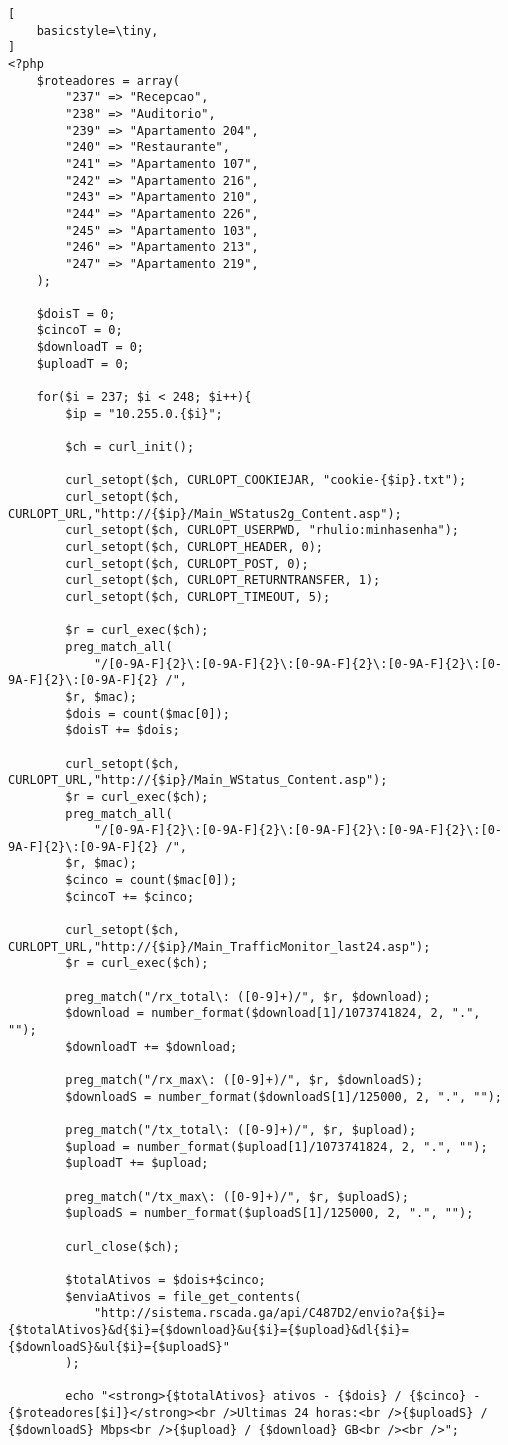 \label{an:anexo-roteadores}

\begin{lstlisting}[
    basicstyle=\tiny,
]
<?php
    $roteadores = array(
		"237" => "Recepcao",
		"238" => "Auditorio",
		"239" => "Apartamento 204",
		"240" => "Restaurante",
		"241" => "Apartamento 107",
		"242" => "Apartamento 216",
		"243" => "Apartamento 210",
		"244" => "Apartamento 226",
		"245" => "Apartamento 103",
		"246" => "Apartamento 213",
		"247" => "Apartamento 219",
	);

	$doisT = 0;
	$cincoT = 0;
	$downloadT = 0;
	$uploadT = 0;

	for($i = 237; $i < 248; $i++){
		$ip = "10.255.0.{$i}";

		$ch = curl_init();

		curl_setopt($ch, CURLOPT_COOKIEJAR, "cookie-{$ip}.txt");
		curl_setopt($ch, CURLOPT_URL,"http://{$ip}/Main_WStatus2g_Content.asp");
		curl_setopt($ch, CURLOPT_USERPWD, "rhulio:minhasenha");
		curl_setopt($ch, CURLOPT_HEADER, 0);
		curl_setopt($ch, CURLOPT_POST, 0);
		curl_setopt($ch, CURLOPT_RETURNTRANSFER, 1);
		curl_setopt($ch, CURLOPT_TIMEOUT, 5);

		$r = curl_exec($ch);
		preg_match_all(
		    "/[0-9A-F]{2}\:[0-9A-F]{2}\:[0-9A-F]{2}\:[0-9A-F]{2}\:[0-9A-F]{2}\:[0-9A-F]{2} /",
		$r, $mac);
		$dois = count($mac[0]);
		$doisT += $dois;

		curl_setopt($ch, CURLOPT_URL,"http://{$ip}/Main_WStatus_Content.asp");
		$r = curl_exec($ch);
		preg_match_all(
		    "/[0-9A-F]{2}\:[0-9A-F]{2}\:[0-9A-F]{2}\:[0-9A-F]{2}\:[0-9A-F]{2}\:[0-9A-F]{2} /",
		$r, $mac);
		$cinco = count($mac[0]);
		$cincoT += $cinco;

		curl_setopt($ch, CURLOPT_URL,"http://{$ip}/Main_TrafficMonitor_last24.asp");
		$r = curl_exec($ch);

		preg_match("/rx_total\: ([0-9]+)/", $r, $download);
		$download = number_format($download[1]/1073741824, 2, ".", "");
		$downloadT += $download;

		preg_match("/rx_max\: ([0-9]+)/", $r, $downloadS);
		$downloadS = number_format($downloadS[1]/125000, 2, ".", "");

		preg_match("/tx_total\: ([0-9]+)/", $r, $upload);
		$upload = number_format($upload[1]/1073741824, 2, ".", "");
		$uploadT += $upload;
		
		preg_match("/tx_max\: ([0-9]+)/", $r, $uploadS);
		$uploadS = number_format($uploadS[1]/125000, 2, ".", "");

		curl_close($ch);

		$totalAtivos = $dois+$cinco;
		$enviaAtivos = file_get_contents(
		    "http://sistema.rscada.ga/api/C487D2/envio?a{$i}={$totalAtivos}&d{$i}={$download}&u{$i}={$upload}&dl{$i}={$downloadS}&ul{$i}={$uploadS}"
		);

		echo "<strong>{$totalAtivos} ativos - {$dois} / {$cinco} - {$roteadores[$i]}</strong><br />Ultimas 24 horas:<br />{$uploadS} / {$downloadS} Mbps<br />{$upload} / {$download} GB<br /><br />";
\end{lstlisting}